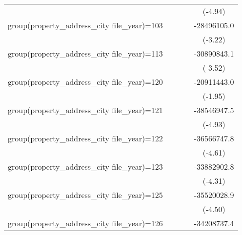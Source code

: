 {\begin{tabular}{l*{4}{c}}
                    &                     &                     &                     &     (-4.94)         \\
\addlinespace
group(property\_address\_city file\_year)=103&                     &                     &                     & -28496105.0\sym{**} \\
                    &                     &                     &                     &     (-3.22)         \\
\addlinespace
group(property\_address\_city file\_year)=113&                     &                     &                     & -30890843.1\sym{***}\\
                    &                     &                     &                     &     (-3.52)         \\
\addlinespace
group(property\_address\_city file\_year)=120&                     &                     &                     & -20911443.0         \\
                    &                     &                     &                     &     (-1.95)         \\
\addlinespace
group(property\_address\_city file\_year)=121&                     &                     &                     & -38546947.5\sym{***}\\
                    &                     &                     &                     &     (-4.93)         \\
\addlinespace
group(property\_address\_city file\_year)=122&                     &                     &                     & -36566747.8\sym{***}\\
                    &                     &                     &                     &     (-4.61)         \\
\addlinespace
group(property\_address\_city file\_year)=123&                     &                     &                     & -33882902.8\sym{***}\\
                    &                     &                     &                     &     (-4.31)         \\
\addlinespace
group(property\_address\_city file\_year)=125&                     &                     &                     & -35520028.9\sym{***}\\
                    &                     &                     &                     &     (-4.50)         \\
\addlinespace
group(property\_address\_city file\_year)=126&                     &                     &                     & -34208737.4\sym{***}\\

\end{tabular}}
